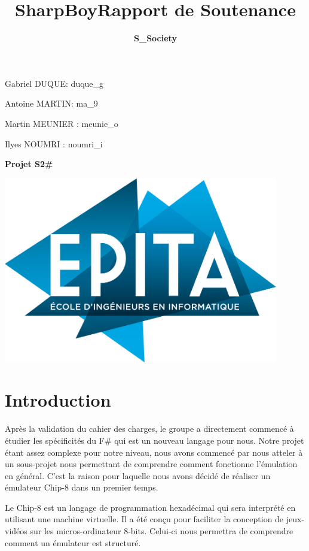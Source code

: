 \documentclass[12pt, a4paper]{article}
\title{\Huge \bf SharpBoy}
\author{\LARGE \bf S\_Society }
\title{\Large \bf Rapport de Soutenance}
\begin{document}
\maketitle


\bigskip
\large Gabriel DUQUE: duque\_g

\bigskip
\large Antoine MARTIN: ma\_9

\bigskip
\large Martin MEUNIER : meunie\_o

\bigskip
\large Ilyes NOUMRI : noumri\_i

\bigskip
\large {\textbf{Projet S2\#}}

\bigskip 
\bigskip
\bigskip



\begin{center}
\includegraphics[width= 12cm]{logo-epita-hd.png} 
\end{center}


\pagebreak

\tableofcontents 

\pagebreak

\large
\section{Introduction}
Après la validation du cahier des charges, le groupe a directement commencé à étudier les spécificités du F\# qui est un nouveau langage pour nous. Notre projet étant assez complexe pour notre niveau, nous avons commencé par nous atteler à un sous-projet nous permettant de comprendre comment fonctionne l'émulation en général. C'est la raison pour laquelle nous avons décidé de réaliser un émulateur Chip-8 dans un premier temps.

\medskip
Le Chip-8 est un langage de programmation hexadécimal qui sera interprété en utilisant une machine virtuelle. Il a été conçu pour faciliter la conception de jeux-vidéos sur les micros-ordinateur 8-bits. Celui-ci nous permettra de comprendre comment un émulateur est structuré. 
\end{document}
